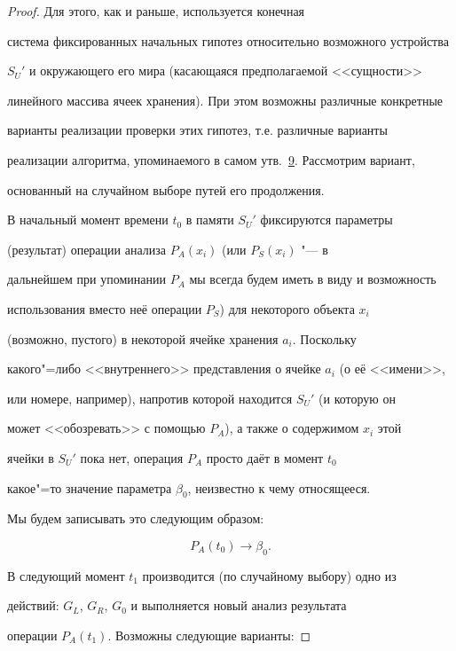 \begin{proof} Для этого, как и раньше, используется конечная

система фиксированных начальных гипотез относительно возможного устройства

$S_{U}'$ и окружающего его мира (касающаяся предполагаемой <<сущности>>

линейного массива ячеек хранения). При этом возможны различные конкретные

варианты реализации проверки этих гипотез, т.е. различные варианты

реализации  алгоритма, упоминаемого в самом утв.~\hyperlink{kr:utv9}{9}. Рассмотрим вариант,

основанный на случайном выборе путей его продолжения.



В начальный момент времени $t_{0}$ в памяти $S_{U}'$ фиксируются параметры

(результат) операции анализа $P_{A}(x_{i})$ (или $P_{S}(x_{i})$ "--- в

дальнейшем при упоминании $P_{A}$ мы всегда будем иметь в виду и возможность

использования вместо неё операции $P_{S}$) для некоторого объекта $x_{i}$

(возможно, пустого) в некоторой ячейке хранения $a_{i}$. Поскольку

какого"=либо <<внутреннего>> представления о ячейке $a_{i}$ (о её <<имени>>,

или номере, например), напротив которой находится $S_{U}'$ (и которую он

может <<обозревать>> с помощью $P_{A}$), а также о содержимом $x_{i}$ этой

ячейки в $S_{U}'$ пока нет, операция $P_{A}$ просто даёт в момент $t_{0}$

какое"=то значение параметра $\beta_0$, неизвестно к чему относящееся. 

Мы будем записывать это следующим образом:

$$

P_{A}(t_{0}) \to \beta_0.

$$



В следующий момент $t_{1}$ производится (по случайному выбору) одно из

действий: $G_{L}$, $G_{R}$, $G_{0}$ и выполняется новый анализ результата

операции $P_{A}(t_{1})$. Возможны следующие варианты:


\end{proof}
